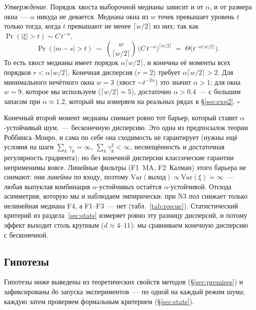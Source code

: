 \documentclass[conference]{IEEEtran}
\begin{document}
\emph{Утверждение.} Порядок хвоста выборочной медианы зависит и от
$\alpha$, и от размера окна~--- $\alpha$ никуда не девается. Медиана окна
из $w$ точек превышает уровень $t$ только тогда, когда $t$ превышают не
менее $\lceil w/2\rceil$ из них; так как $\Pr(|\xi|>t)\sim C\,t^{-\alpha}$,
\[
  \Pr(|m-s|>t)\;\sim\;\binom{w}{\lceil w/2\rceil}\,
  \bigl(C\,t^{-\alpha}\bigr)^{\lceil w/2\rceil}
  \;=\;\Theta\!\bigl(t^{-\alpha\lceil w/2\rceil}\bigr).
\]
То есть хвост медианы имеет порядок $\alpha\lceil w/2\rceil$, и конечны её
моменты всех порядков $r<\alpha\lceil w/2\rceil$. Конечная дисперсия
($r=2$) требует $\alpha\lceil w/2\rceil>2$. Для минимального нечётного окна
$w=3$ (хвост $\sim t^{-2\alpha}$) это значит $\alpha>1$; для окна $w=9$,
которое мы используем ($\lceil w/2\rceil=5$), достаточно $\alpha>0.4$~---
с большим запасом при $\alpha\approx1.2$, который мы измеряем на реальных
рядах в §\ref{sec:exp2}. $\square$

Конечный второй момент медианы снимает ровно тот барьер, который ставит
$\alpha$-устойчивый шум,~--- бесконечную дисперсию. Это одна из предпосылок
теории Роббинса--Монро, и сама по себе она сходимость не гарантирует
(нужны ещё условия на шаги $\sum_k\gamma_k=\infty$, $\sum_k\gamma_k^2<\infty$,
несмещённость и достаточная регулярность градиента); но без конечной
дисперсии классические гарантии неприменимы вовсе. Линейные фильтры
(F1~MA, F2~Калман) этого барьера не снимают: они \emph{линейны} по входу,
поэтому $\mathrm{Var}(\text{выход})\propto\mathrm{Var}(\xi)=\infty$~--- любая
выпуклая комбинация $\alpha$-устойчивых остаётся $\alpha$-устойчивой.
Отсюда асимметрия, которую мы и наблюдаем эмпирически: при N3 пол
снижает только нелинейная медиана F4, а F1--F3~--- нет
(табл.~\ref{tab:rescue}). Статистический критерий из
раздела~\ref{sec:stats} измеряет ровно эту разницу дисперсий, и потому
эффект выходит столь крупным ($d\approx4$--$11$): мы сравниваем конечную
дисперсию с бесконечной.

\subsection{Гипотезы}
\label{sec:hyp}

Гипотезы ниже выведены из теоретических свойств методов (§\ref{sec:premises})
и зафиксированы \emph{до} запуска экспериментов~--- по одной на каждый
режим шума; каждую затем проверяем формальным критерием (§\ref{sec:stats}).
\end{document}
